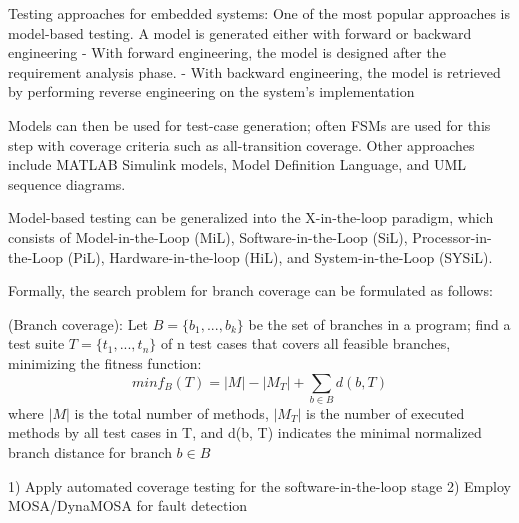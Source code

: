 Testing approaches for embedded systems:
One of the most popular approaches is model-based testing. A model is generated either with forward or backward engineering
	- With forward engineering, the model is designed after the requirement analysis phase.
	- With backward engineering, the model is retrieved by performing reverse engineering on the system's implementation

Models can then be used for test-case generation; often FSMs are used for this step with coverage criteria such as all-transition coverage. Other approaches include MATLAB Simulink models, Model Definition Language, and UML sequence diagrams.

Model-based testing can be generalized into the X-in-the-loop paradigm, which consists of Model-in-the-Loop (MiL), Software-in-the-Loop (SiL), Processor-in-the-Loop (PiL), Hardware-in-the-loop (HiL), and System-in-the-Loop (SYSiL).



Formally, the search problem for branch coverage can be formulated as follows:

\begin{problem}(Branch coverage):
    Let $ B = \{b_1,...,b_k\} $ be the set of branches in a program; find a test suite $ T = \{t_1,...,t_n \} $ of n test cases that covers all feasible branches, minimizing the fitness function:
    \begin{equation}
        min f_B (T) = |M| - |M_T| + \sum_{b \in B} d(b, T)
    \end{equation}
    where $|M|$ is the total number of methods, $|M_T|$ is the number of executed methods by all test cases in T, and d(b, T) indicates the minimal normalized branch distance for branch $ b \in B $
\end{problem}



1) Apply automated coverage testing for the software-in-the-loop stage
2) Employ MOSA/DynaMOSA for fault detection


